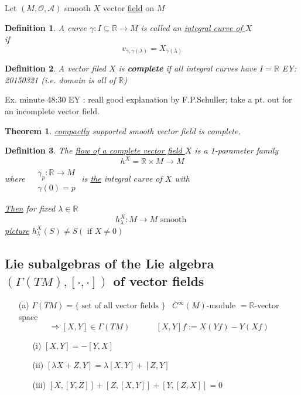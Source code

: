 \documentclass[10pt, twoside]{amsart}
\newtheorem{theorem}{Theorem}
\newtheorem{definition}{Definition}
\begin{document}
\begin{multicols*}{2}
Let $(M,\mathcal{O},\mathcal{A})$ smooth $X$ vector \underline{field} on $M$

\begin{definition}
  A curve $\gamma :I \subseteq \mathbb{R} \to M$ is called an \underline{integral curve of $X$} \\
if 
\[
v_{\gamma,\gamma(\lambda)} = X_{\gamma(\lambda)}
\]
\end{definition}

\begin{definition} A vector filed $X$ is \textbf{complete} if all integral curves have $I = \mathbb{R}$ EY: 20150321 (i.e. domain is all of $\mathbb{R}$)
\end{definition}

Ex. minute 48:30 EY : reall good explanation by F.P.Schuller; take a pt. out for an incomplete vector field.

\begin{theorem}
  \underline{compactly} supported smooth vector field is complete.  
\end{theorem}

\begin{definition} The \underline{flow of a complete vector field $X$} is a 1-parameter family
\[
h^X = \mathbb{R}\times M \to M
\]
where $\begin{aligned} & \quad \\ 
  & \gamma_p : \mathbb{R} \to M \\
  & \gamma(0) = p \end{aligned}$ is \underline{the} integral curve of $X$ with 

\underline{Then} for fixed $\lambda \in \mathbb{R}$ 
\[
h_{\lambda}^X : M \to M \text{ smooth }
\]
\underline{picture}  $h^X_{\underline{\lambda}}(S) \neq S (\text{ if } X \neq 0 )$
\end{definition}

\subsection{Lie subalgebras of the Lie algebra $(\Gamma(TM) , [ \cdot , \cdot ] )$ of vector fields}

\begin{enumerate}
  \item[(a)] $\Gamma(TM) = \lbrace \text{ set of all vector fields } \rbrace$ \quad \, $C^{\infty}(M)$-module $ = \mathbb{R}$-vector space \[
\Longrightarrow [X,Y] \in \Gamma(TM) \quad \quad \quad \, [X,Y] f := X(Yf) - Y(Xf)
\]
\begin{enumerate}
\item[(i)] $[X,Y] = -[Y,X]$ 
\item[(ii)] $[\lambda X + Z, Y] = \lambda [X,Y] + [Z,Y]$
\item[(iii)] $[X,[Y,Z]]  + [Z,[X,Y]] + [Y,[Z,X]] =0$ 


\end{enumerate}
\end{enumerate}
\end{multicols*}
\end{document}
